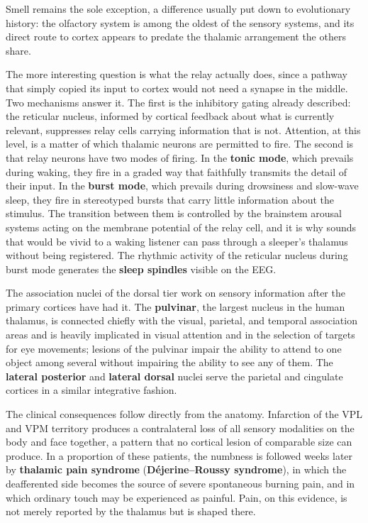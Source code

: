 \documentclass[11pt]{article}
\begin{document}
Smell remains the sole exception, a difference usually put down to evolutionary history: the olfactory system is among the oldest of the sensory systems, and its direct route to cortex appears to predate the thalamic arrangement the others share.

The more interesting question is what the relay actually does, since a pathway that simply copied its input to cortex would not need a synapse in the middle. Two mechanisms answer it. The first is the inhibitory gating already described: the reticular nucleus, informed by cortical feedback about what is currently relevant, suppresses relay cells carrying information that is not. Attention, at this level, is a matter of which thalamic neurons are permitted to fire. The second is that relay neurons have two modes of firing. In the \textbf{tonic mode}, which prevails during waking, they fire in a graded way that faithfully transmits the detail of their input. In the \textbf{burst mode}, which prevails during drowsiness and slow-wave sleep, they fire in stereotyped bursts that carry little information about the stimulus. The transition between them is controlled by the brainstem arousal systems acting on the membrane potential of the relay cell, and it is why sounds that would be vivid to a waking listener can pass through a sleeper's thalamus without being registered. The rhythmic activity of the reticular nucleus during burst mode generates the \textbf{sleep spindles} visible on the EEG.

The association nuclei of the dorsal tier work on sensory information after the primary cortices have had it. The \textbf{pulvinar}, the largest nucleus in the human thalamus, is connected chiefly with the visual, parietal, and temporal association areas and is heavily implicated in visual attention and in the selection of targets for eye movements; lesions of the pulvinar impair the ability to attend to one object among several without impairing the ability to see any of them. The \textbf{lateral posterior} and \textbf{lateral dorsal} nuclei serve the parietal and cingulate cortices in a similar integrative fashion.

The clinical consequences follow directly from the anatomy. Infarction of the VPL and VPM territory produces a contralateral loss of all sensory modalities on the body and face together, a pattern that no cortical lesion of comparable size can produce. In a proportion of these patients, the numbness is followed weeks later by \textbf{thalamic pain syndrome} (\textbf{D\'ejerine--Roussy syndrome}), in which the deafferented side becomes the source of severe spontaneous burning pain, and in which ordinary touch may be experienced as painful. Pain, on this evidence, is not merely reported by the thalamus but is shaped there.
\end{document}
